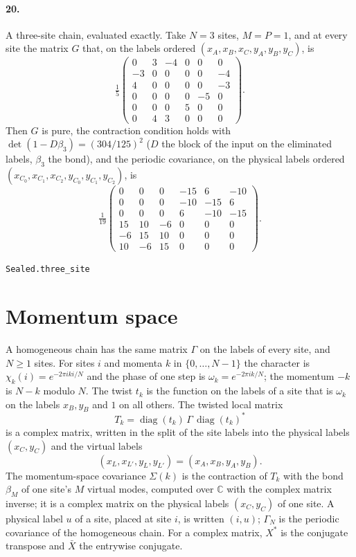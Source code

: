 \documentclass[11pt]{article}
\begin{document}
\paragraph{20.} A three-site chain, evaluated exactly. Take $N = 3$ sites, $M = P = 1$, and at every site the matrix $G$ that, on the labels ordered $(x_A, x_B, x_C, y_A, y_B, y_C)$, is \[\tfrac15 \begin{pmatrix} 0 & 3 & -4 & 0 & 0 & 0 \\ -3 & 0 & 0 & 0 & 0 & -4 \\ 4 & 0 & 0 & 0 & 0 & -3 \\ 0 & 0 & 0 & 0 & -5 & 0 \\ 0 & 0 & 0 & 5 & 0 & 0 \\ 0 & 4 & 3 & 0 & 0 & 0 \end{pmatrix}.\] Then $G$ is pure, the contraction condition holds with $\det(1 - D\beta_3) = (304/125)^2$ ($D$ the block of the input on the eliminated labels, $\beta_3$ the bond), and the periodic covariance, on the physical labels ordered $(x_{C_0}, x_{C_1}, x_{C_2}, y_{C_0}, y_{C_1}, y_{C_2})$, is \[\tfrac1{19} \begin{pmatrix} 0 & 0 & 0 & -15 & 6 & -10 \\ 0 & 0 & 0 & -10 & -15 & 6 \\ 0 & 0 & 0 & 6 & -10 & -15 \\ 15 & 10 & -6 & 0 & 0 & 0 \\ -6 & 15 & 10 & 0 & 0 & 0 \\ 10 & -6 & 15 & 0 & 0 & 0 \end{pmatrix}.\]\par{\footnotesize\texttt{Sealed.three\_site}}

\section*{Momentum space}
A homogeneous chain has the same matrix $\Gamma$ on the labels of every site, and $N \ge 1$ sites. For sites $i$ and momenta $k$ in $\{0, \dots, N - 1\}$ the character is $\chi_k(i) = e^{-2\pi i k i / N}$ and the phase of one step is $\omega_k = e^{-2\pi i k / N}$; the momentum $-k$ is $N - k$ modulo $N$. The twist $t_k$ is the function on the labels of a site that is $\omega_k$ on the labels $x_B, y_B$ and $1$ on all others. The twisted local matrix \[T_k = \operatorname{diag}(t_k)\, \Gamma\, \operatorname{diag}(t_k)^*\] is a complex matrix, written in the split of the site labels into the physical labels $(x_C, y_C)$ and the virtual labels \[(x_L, x_{L'}, y_L, y_{L'}) = (x_A, x_B, y_A, y_B).\] The momentum-space covariance $\Sigma(k)$ is the contraction of $T_k$ with the bond $\beta_M$ of one site's $M$ virtual modes, computed over $\mathbb C$ with the complex matrix inverse; it is a complex matrix on the physical labels $(x_C, y_C)$ of one site. A physical label $u$ of a site, placed at site $i$, is written $(i, u)$; $\Gamma_N$ is the periodic covariance of the homogeneous chain. For a complex matrix, $X^*$ is the conjugate transpose and $\bar X$ the entrywise conjugate.
\end{document}
